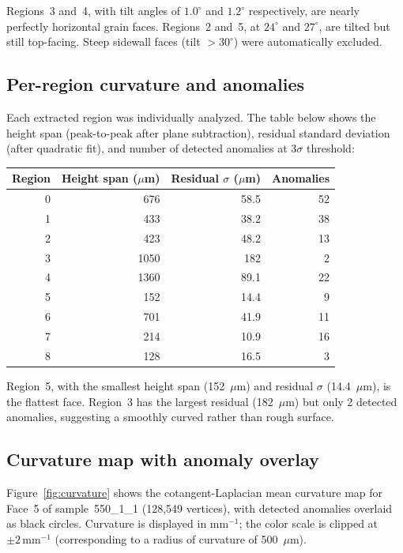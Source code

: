 \documentclass[11pt]{article}
\begin{document}
Regions~3 and~4, with tilt angles of $1.0^{\circ}$ and $1.2^{\circ}$
respectively, are nearly perfectly horizontal grain faces.
Regions~2 and~5, at $24^{\circ}$ and $27^{\circ}$, are tilted but
still top-facing.  Steep sidewall faces (tilt $> 30^{\circ}$) were
automatically excluded.

\subsection{Per-region curvature and anomalies}

Each extracted region was individually analyzed.  The table below
shows the height span (peak-to-peak after plane subtraction),
residual standard deviation (after quadratic fit), and number of
detected anomalies at $3\sigma$ threshold:

\begin{center}
\begin{tabular}{rrrr}
\toprule
\textbf{Region} & \textbf{Height span ($\mu$m)}
  & \textbf{Residual $\sigma$ ($\mu$m)} & \textbf{Anomalies} \\
\midrule
0 & 676 & 58.5 & 52 \\
1 & 433 & 38.2 & 38 \\
2 & 423 & 48.2 & 13 \\
3 & 1050 & 182 & 2 \\
4 & 1360 & 89.1 & 22 \\
5 & 152 & 14.4 & 9 \\
6 & 701 & 41.9 & 11 \\
7 & 214 & 10.9 & 16 \\
8 & 128 & 16.5 & 3 \\
\bottomrule
\end{tabular}
\end{center}

Region~5, with the smallest height span (152~$\mu$m) and residual
$\sigma$ (14.4~$\mu$m), is the flattest face.  Region~3 has the
largest residual (182~$\mu$m) but only 2 detected anomalies,
suggesting a smoothly curved rather than rough surface.

\subsection{Curvature map with anomaly overlay}

Figure~\ref{fig:curvature} shows the cotangent-Laplacian mean
curvature map for Face~5 of sample~550\_1\_1 (128,549 vertices),
with detected anomalies overlaid as black circles.  Curvature is
displayed in $\text{mm}^{-1}$; the color scale is clipped at
$\pm 2\,\text{mm}^{-1}$ (corresponding to a radius of curvature of
500~$\mu$m).
\end{document}
